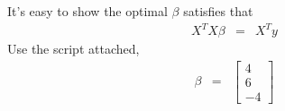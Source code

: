 \documentclass[12pt]{article}
\begin{document}
\section{}
It's easy to show the optimal $\beta$ satisfies that
\begin{eqnarray*}
    X^TX \beta &=& X^Ty
\end{eqnarray*}
Use the script attached, 
\begin{eqnarray*}
    \beta &=& %
    \begin{bmatrix}
        4\\
        6\\
        -4
    \end{bmatrix}%
\end{eqnarray*}
\section{}
\end{document}
